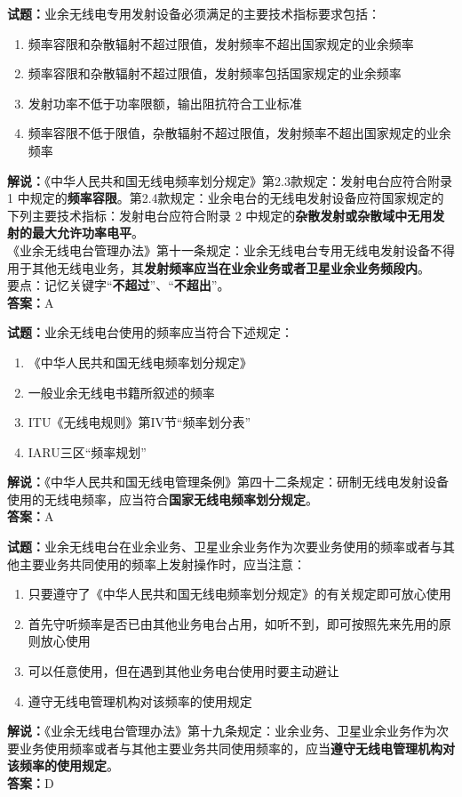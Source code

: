 \documentclass{ctexbook}
\begin{document}
\noindent\textbf{试题：}业余无线电专用发射设备必须满足的主要技术指标要求包括：
\begin{enumerate}[leftmargin=3em]
  \item 频率容限和杂散辐射不超过限值，发射频率不超出国家规定的业余频率
  \item 频率容限和杂散辐射不超过限值，发射频率包括国家规定的业余频率
  \item 发射功率不低于功率限额，输出阻抗符合工业标准
  \item 频率容限不低于限值，杂散辐射不超过限值，发射频率不超出国家规定的业余频率
\end{enumerate}
\noindent\textbf{解说：}《中华人民共和国无线电频率划分规定》第2.3款规定：发射电台应符合附录 1 中规定的\textbf{频率容限}。第2.4款规定：业余电台的无线电发射设备应符国家规定的下列主要技术指标：发射电台应符合附录 2 中规定的\textbf{杂散发射或杂散域中无用发射的最大允许功率电平}。\\《业余无线电台管理办法》第十一条规定：业余无线电台专用无线电发射设备不得用于其他无线电业务，其\textbf{发射频率应当在业余业务或者卫星业余业务频段内}。\\要点：记忆关键字“\textbf{不超过}”、“\textbf{不超出}”。\\\noindent\textbf{答案：}A

\vspace{\baselineskip}

\noindent\textbf{试题：}业余无线电台使用的频率应当符合下述规定：
\begin{enumerate}[leftmargin=3em]
  \item 《中华人民共和国无线电频率划分规定》
  \item 一般业余无线电书籍所叙述的频率
  \item ITU《无线电规则》第IV节“频率划分表”
  \item IARU三区“频率规划”
\end{enumerate}
\noindent\textbf{解说：}《中华人民共和国无线电管理条例》第四十二条规定：研制无线电发射设备使用的无线电频率，应当符合\textbf{国家无线电频率划分规定}。\\\noindent\textbf{答案：}A

\vspace{\baselineskip}

\noindent\textbf{试题：}业余无线电台在业余业务、卫星业余业务作为次要业务使用的频率或者与其他主要业务共同使用的频率上发射操作时，应当注意：
\begin{enumerate}[leftmargin=3em]
  \item 只要遵守了《中华人民共和国无线电频率划分规定》的有关规定即可放心使用
  \item 首先守听频率是否已由其他业务电台占用，如听不到，即可按照先来先用的原则放心使用
  \item 可以任意使用，但在遇到其他业务电台使用时要主动避让
  \item 遵守无线电管理机构对该频率的使用规定
\end{enumerate}
\noindent\textbf{解说：}《业余无线电台管理办法》第十九条规定：业余业务、卫星业余业务作为次要业务使用频率或者与其他主要业务共同使用频率的，应当\textbf{遵守无线电管理机构对该频率的使用规定}。\\\noindent\textbf{答案：}D
\end{document}
